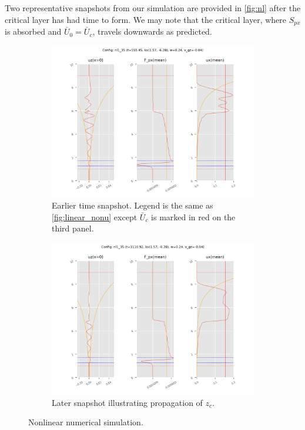 \documentclass[twocolumn,
        nofootinbib,
        usenames, %
        dvipsnames %
    ]{revtex4-1}%
\begin{document}
Two representative snapshots from our simulation are provided in
\autoref{fig:nl} after the critical layer has had time to form. We may note that
the critical layer, where $S_{px}$ is absorbed and $\bar{U}_0 = \bar{U}_c$,
travels downwards as predicted.
\begin{figure}[h]
    \centering
    \begin{subfigure}{0.5\textwidth}
        \centering
        \includegraphics[width=\textwidth]{plots/nl35_1.png}
        \caption{Earlier time snapshot. Legend is the same as
        \autoref{fig:linear_nonu} except $\bar{U}_c$ is marked in red on the
        third panel.}
    \end{subfigure}

    \begin{subfigure}{0.5\textwidth}
        \centering
        \includegraphics[width=\textwidth]{plots/nl35_2.png}
        \caption{Later snapshot illustrating propagation of $z_c$.}
    \end{subfigure}
    \caption{Nonlinear numerical simulation.}\label{fig:nl}
\end{figure}
\end{document}
